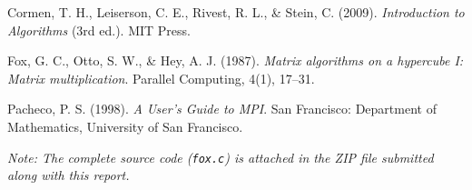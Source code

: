 \documentclass[10pt,a4paper]{article}
\begin{document}
\begin{thebibliography}{9}
Cormen, T. H., Leiserson, C. E., Rivest, R. L., \& Stein, C. (2009).
\textit{Introduction to Algorithms} (3rd ed.).
MIT Press.

Fox, G. C., Otto, S. W., \& Hey, A. J. (1987).
\textit{Matrix algorithms on a hypercube I: Matrix multiplication}.
Parallel Computing, 4(1), 17–31.

Pacheco, P. S. (1998).
\textit{A User's Guide to MPI}.
San Francisco: Department of Mathematics, University of San Francisco.
  \end{thebibliography}

\vspace{0.3cm}
  
\textit{Note: The complete source code (\texttt{fox.c}) is attached in the ZIP file submitted along with this report.}
\end{document}
